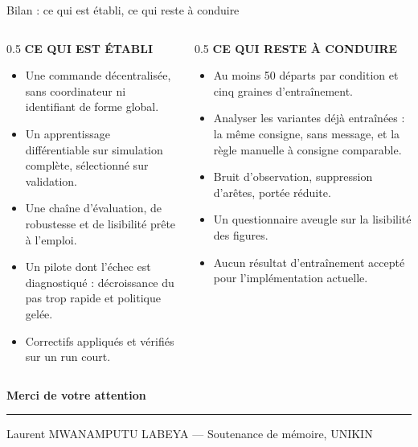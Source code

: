 \documentclass[10pt,aspectratio=169]{beamer}
\begin{document}
{
\begin{frame}{Bilan : ce qui est établi, ce qui reste à conduire}
  \color{white}\relax
  \begin{columns}[T]
    \begin{column}{0.5\textwidth}
      \textbf{\color{swarmgold}CE QUI EST ÉTABLI}
      \begin{itemize}\footnotesize\color{white}
        \item Une commande décentralisée, sans coordinateur ni identifiant de forme global.
        \item Un apprentissage différentiable sur simulation complète, sélectionné sur validation.
        \item Une chaîne d'évaluation, de robustesse et de lisibilité prête à l'emploi.
        \item Un pilote dont l'échec est diagnostiqué : décroissance du pas trop rapide et politique gelée.
        \item Correctifs appliqués et vérifiés sur un run court.
      \end{itemize}
    \end{column}
    \begin{column}{0.5\textwidth}
      \textbf{\color{swarmgold}CE QUI RESTE À CONDUIRE}
      \begin{itemize}\footnotesize\color{white}
        \item Au moins 50 départs par condition et cinq graines d'entraînement.
        \item Analyser les variantes déjà entraînées : la même consigne, sans message, et la règle manuelle à consigne comparable.
        \item Bruit d'observation, suppression d'arêtes, portée réduite.
        \item Un questionnaire aveugle sur la lisibilité des figures.
        \item Aucun résultat d'entraînement accepté pour l'implémentation actuelle.
      \end{itemize}
    \end{column}
  \end{columns}
  \vfill
  \begin{center}
    {\color{white}\LARGE\bfseries Merci de votre attention\par}
    \vspace{0.4em}
    {\color{swarmgold}\rule{2.4cm}{1.2pt}\par}
    \vspace{0.5em}
    {\footnotesize Laurent MWANAMPUTU LABEYA --- Soutenance de mémoire, UNIKIN\par}
  \end{center}
\end{frame}
}
\end{document}
